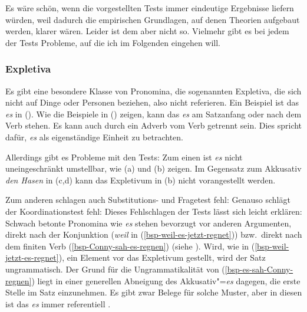 Es wäre schön, wenn die vorgestellten Tests immer eindeutige Ergebnisse liefern würden,
weil dadurch die empirischen Grundlagen, auf denen Theorien aufgebaut werden, klarer
wären. Leider ist dem aber nicht so. Vielmehr gibt es bei jedem der Tests Probleme,
auf die ich im Folgenden eingehen will.

\subsubsection{Expletiva}

Es gibt eine besondere Klasse von Pronomina, die sogenannten Expletiva, die sich nicht
auf Dinge oder Personen beziehen, also nicht referieren. Ein Beispiel ist das \emph{es} in
().
\eal
{}
\zl
Wie die Beispiele in () zeigen, kann das \emph{es} am Satzanfang
oder nach dem Verb stehen. Es kann auch durch ein Adverb vom Verb getrennt sein.
Dies spricht dafür, \emph{es} als eigenständige Einheit zu betrachten.

Allerdings gibt es Probleme mit den Tests: Zum einen ist \emph{es} nicht
uneingeschränkt umstellbar, wie (a) und (b) zeigen.
\eal
{}
\zl
\eal
{}
\zl
Im Gegensatz zum Akkusativ \emph{den Hasen} in (c,d) kann das Expletivum in (b) nicht
vorangestellt werden.

Zum anderen schlagen auch Substitutions- und Fragetest fehl:
\eal
{}
\zl
Genauso schlägt der Koordinationstest fehl:
\z
Dieses Fehlschlagen der Tests lässt sich leicht erklären: Schwach betonte
Pronomina wie \emph{es} stehen bevorzugt vor anderen Argumenten, direkt nach
der Konjunktion (\emph{weil} in (\ref{bsp-weil-es-jetzt-regnet})) bzw.\
direkt nach dem finiten Verb (\ref{bsp-Conny-sah-es-regnen}) (siehe \citealt[]{Abraham95a-u}). Wird, wie
in (\ref{bsp-weil-jetzt-es-regnet}), ein Element vor das Expletivum gestellt,
wird der Satz ungrammatisch. Der Grund für die Ungrammatikalität von
(\ref{bsp-es-sah-Conny-regnen}) liegt in einer generellen Abneigung des 
Akkusativ"=\emph{es} dagegen, die erste Stelle im Satz einzunehmen. Es gibt zwar Belege für
solche Muster, aber in diesen ist das \emph{es} immer referentiell \parencites[\page162]{Lenerz94a}[]{GS97a}.

